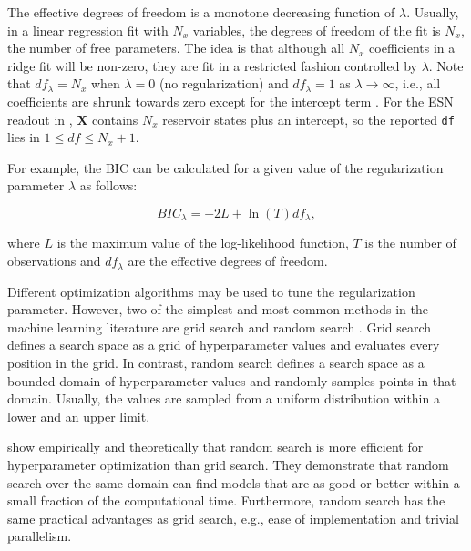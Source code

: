 The effective degrees of freedom is a monotone decreasing function of \(\lambda\). Usually, in a linear regression fit with \(N_x\) variables, the degrees of freedom of the fit is \(N_x\), the number of free parameters. The idea is that although all \(N_x\) coefficients in a ridge fit will be non-zero, they are fit in a restricted fashion controlled by \(\lambda\). Note that \(df_{\lambda} = N_x\) when \(\lambda = 0\) (no regularization) and \(df_{\lambda} = 1\) as \(\lambda \rightarrow \infty\), i.e., all coefficients are shrunk towards zero except for the intercept term \citep{Hastie2009}. For the ESN readout in , \(\mathbf{X}\) contains \(N_x\) reservoir states plus an intercept, so the reported \texttt{df} lies in \(1 \le df \le N_x+1\).

For example, the BIC can be calculated for a given value of the regularization parameter \(\lambda\) as follows:

\begin{equation}
BIC_{\lambda} = -2 L + \ln(T) df_{\lambda},
\label{eq:bic}
\end{equation}

where \(L\) is the maximum value of the log-likelihood function, \(T\) is the number of observations and \(df_{\lambda}\) are the effective degrees of freedom.

Different optimization algorithms may be used to tune the regularization parameter. However, two of the simplest and most common methods in the machine learning literature are grid search and random search \citep{Bergstra2012}. Grid search defines a search space as a grid of hyperparameter values and evaluates every position in the grid. In contrast, random search defines a search space as a bounded domain of hyperparameter values and randomly samples points in that domain. Usually, the values are sampled from a uniform distribution within a lower and an upper limit.

\citet{Bergstra2012} show empirically and theoretically that random search is more efficient for hyperparameter optimization than grid search. They demonstrate that random search over the same domain can find models that are as good or better within a small fraction of the computational time. Furthermore, random search has the same practical advantages as grid search, e.g., ease of implementation and trivial parallelism.

